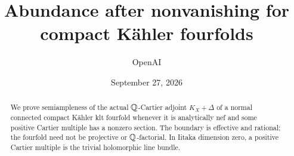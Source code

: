 \documentclass[11pt,letterpaper]{article}
\title{Abundance after nonvanishing for compact K\"ahler fourfolds}
\author{OpenAI}
\date{September 27, 2026}
\begin{document}
\maketitle
\begin{abstract}
We prove semiampleness of the actual \(\mathbb Q\)-Cartier adjoint
\(K_X+\Delta\) of a normal connected compact K\"ahler klt fourfold
whenever it is analytically nef and some positive Cartier multiple has
a nonzero section. The boundary is effective and rational; the fourfold
need not be projective or \(\mathbb Q\)-factorial. In Iitaka dimension zero,
a positive Cartier multiple is the trivial holomorphic line bundle.
\end{abstract}
\tableofcontents














{}

\end{document}

